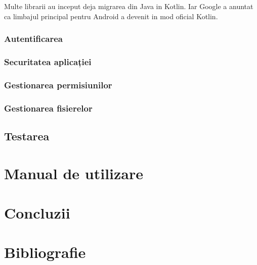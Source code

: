 \documentclass[12pt]{article}
\begin{document}
Multe librarii au inceput deja migrarea din Java in Kotlin. Iar Google a anuntat ca limbajul principal
pentru Android a devenit in mod oficial Kotlin.


\subsubsection{Autentificarea}
\subsubsection{Securitatea aplicației}
\subsubsection{Gestionarea permisiunilor}
\subsubsection{Gestionarea fisierelor}

\subsection{Testarea}

\section{Manual de utilizare}

\section{Concluzii}

\newpage
\section{Bibliografie}
\nocite{owasp-top10-2017}
\nocite{owasp-top10-mobile}
\nocite{3ways-auth}

\nocite{liu2016follow}
\nocite{ssidloc}
\nocite{googleperm}
\nocite{redditcalc}

\nocite{rfc-7519}
\nocite{jwt}
\nocite{enisa-2017}
\nocite{enisa-security-data-processing}
\nocite{goldberg1998comparison}
\nocite{felt2017measuring}
\nocite{fette2011websocket}
\nocite{erkkila2012websocket}
\nocite{test-ws}

\nocite{katz1996handbook}
\nocite{tutrsa}
\nocite{jonsson2003public}

\nocite{kahn2010mobile}
\nocite{barton2012regulation}

\nocite{mvvmpng}

\nocite{masse2011rest}
\nocite{tilkov2010node}
\nocite{reqpersec}

\nocite{banker2011mongodb}
\nocite{nayak2013type}


\nocite{jetpackpng}
\nocite{statcounter}
\nocite{moskala2017android}
\nocite{kotlinvsjava}

\printbibliography[title=Bibliografie]
\end{document}
